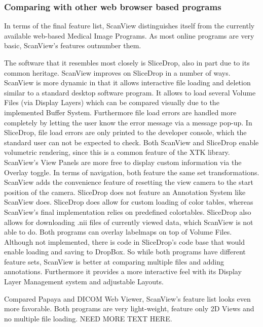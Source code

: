 \documentclass[a4paper,11pt,titlepage]{article}
\begin{document}
\subsubsection{Comparing with other web browser based programs}

In terms of the final feature list, ScanView distinguishes itself from the currently available web-based Medical Image Programs. As most online programs are very basic, ScanView's features outnumber them. 

The software that it resembles most closely is SliceDrop, also in part due to its common heritage. ScanView improves on SliceDrop in a number of ways. ScanView is more dynamic in that it allows interactive file loading and deletion similar to a standard desktop software program. It allows to load several Volume Files (via Display Layers) which can be compared visually due to the implemented Buffer System. Furthermore file load errors are handled more completely by letting the user know the error message via a message pop-up. In SliceDrop, file load errors are only printed to the developer console, which the standard user can not be expected to check. Both ScanView and SliceDrop enable volumetric rendering, since this is a common feature of the XTK library. ScanView's View Panels are more free to display custom information via the Overlay toggle. In terms of navigation, both feature the same set transformations. ScanView adds the convenience feature of resetting the view camera to the start position of the camera. SliceDrop does not feature an Annotation System like ScanView does. SliceDrop does allow for custom loading of color tables, whereas ScanView's final implementation relies on predefined colortables. SliceDrop also allows for downloading .nii files of currently viewed data, which ScanView is not able to do. Both programs can overlay labelmaps on top of Volume Files. Although not implemented, there is code in SliceDrop's code base that would enable loading and saving to DropBox. So while both programs have different feature sets, ScanView is better at comparing multiple files and adding annotations. Furthermore it provides a more interactive feel with its Display Layer Management system and adjustable Layouts.




Compared Papaya and DICOM Web Viewer, ScanView's feature list looks even more favorable. Both programs are very light-weight, feature only 2D Views and no multiple file loading. NEED MORE TEXT HERE.
\end{document}
